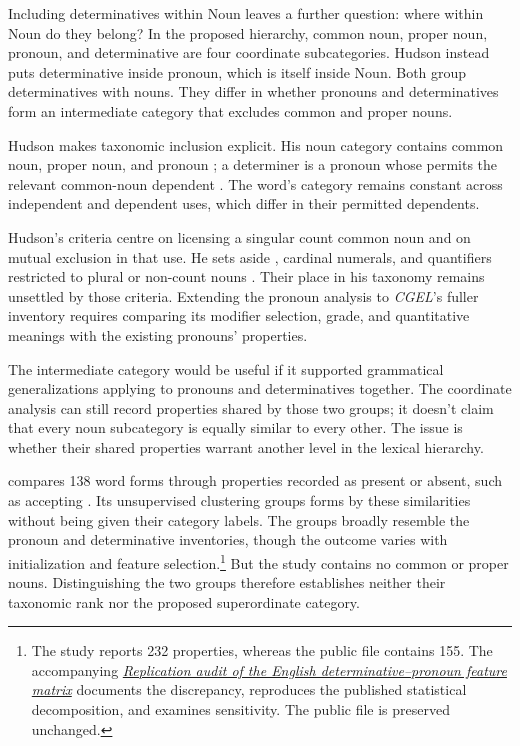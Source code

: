 \documentclass[12pt]{article}
\begin{document}
Including determinatives within Noun leaves a further question: where within Noun do they belong? In the proposed hierarchy, common noun, proper noun, pronoun, and determinative are four coordinate subcategories. Hudson instead puts determinative inside pronoun, which is itself inside Noun. Both group determinatives with nouns. They differ in whether pronouns and determinatives form an intermediate category that excludes common and proper nouns.

Hudson makes taxonomic inclusion explicit. His noun category contains common noun, proper noun, and pronoun \citep[253--254]{hudson2010wordgrammar}; a determiner is a pronoun whose  permits the relevant common-noun dependent \citep[9--10]{hudson2004determiners}. The word's category remains constant across independent and dependent uses, which differ in their permitted dependents.

Hudson's criteria centre on licensing a singular count common noun and on mutual exclusion in that use. He sets aside , cardinal numerals, and quantifiers restricted to plural or non-count nouns \citep[9--10]{hudson2004determiners}. Their place in his taxonomy remains unsettled by those criteria. Extending the pronoun analysis to \textit{CGEL}'s fuller inventory requires comparing its modifier selection, grade, and quantitative meanings with the existing pronouns' properties.

The intermediate category would be useful if it supported grammatical generalizations applying to pronouns and determinatives together. The coordinate analysis can still record properties shared by those two groups; it doesn't claim that every noun subcategory is equally similar to every other. The issue is whether their shared properties warrant another level in the lexical hierarchy.

\textcite{reynolds2021} compares 138 word forms through properties recorded as present or absent, such as accepting . Its unsupervised clustering groups forms by these similarities without being given their category labels. The groups broadly resemble the pronoun and determinative inventories, though the outcome varies with initialization and feature selection.\footnote{The study reports 232 properties, whereas the public file contains 155. The accompanying \href{run:matrix-audit.pdf}{\textit{Replication audit of the English determinative--pronoun feature matrix}} documents the discrepancy, reproduces the published statistical decomposition, and examines sensitivity. The public file is preserved unchanged.} But the study contains no common or proper nouns. Distinguishing the two groups therefore establishes neither their taxonomic rank nor the proposed superordinate category.
\end{document}
